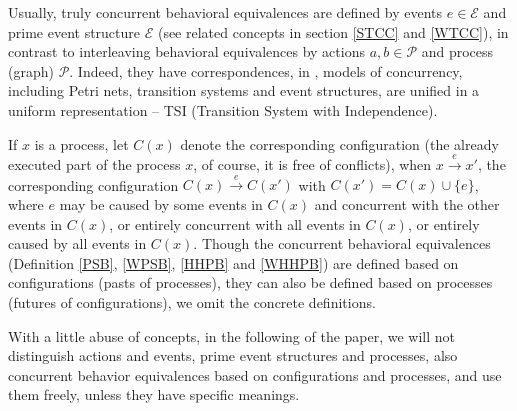 Usually, truly concurrent behavioral equivalences are defined by events $e\in\mathcal{E}$ and prime event structure $\mathcal{E}$ (see related concepts in section \ref{STCC} and \ref{WTCC}), in contrast to interleaving behavioral equivalences by actions $a,b\in\mathcal{P}$ and process (graph) $\mathcal{P}$. Indeed, they have correspondences, in \cite{SFL}, models of concurrency, including Petri nets, transition systems and event structures, are unified in a uniform representation -- TSI (Transition System with Independence).

If $x$ is a process, let $C(x)$ denote the corresponding configuration (the already executed part of the process $x$, of course, it is free of conflicts), when $x\xrightarrow{e} x'$, the corresponding configuration $C(x)\xrightarrow{e}C(x')$ with $C(x')=C(x)\cup\{e\}$, where $e$ may be caused by some events in $C(x)$ and concurrent with the other events in $C(x)$, or entirely concurrent with all events in $C(x)$, or entirely caused by all events in $C(x)$. Though the concurrent behavioral equivalences (Definition \ref{PSB}, \ref{WPSB}, \ref{HHPB} and \ref{WHHPB}) are defined based on configurations (pasts of processes), they can also be defined based on processes (futures of configurations), we omit the concrete definitions.

With a little abuse of concepts, in the following of the paper, we will not distinguish actions and events, prime event structures and processes, also concurrent behavior equivalences based on configurations and processes, and use them freely, unless they have specific meanings.
